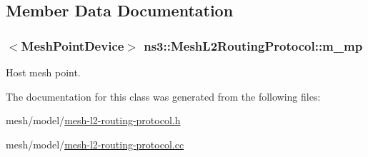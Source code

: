 \subsection{Member Data Documentation}
\subsubsection[{\texorpdfstring{m\+\_\+mp}{m_mp}}]{$<${\bf Mesh\+Point\+Device}$>$ ns3\+::\+Mesh\+L2\+Routing\+Protocol\+::m\+\_\+mp\hspace{0.3cm}{\ttfamily [protected]}}\hypertarget{classns3_1_1MeshL2RoutingProtocol_af4ebb2340b72dfc607ddf3c1ae65b54a}{}\label{classns3_1_1MeshL2RoutingProtocol_af4ebb2340b72dfc607ddf3c1ae65b54a}


Host mesh point. 



The documentation for this class was generated from the following files\+:\begin{DoxyCompactItemize}
\item 
mesh/model/\hyperlink{mesh-l2-routing-protocol_8h}{mesh-\/l2-\/routing-\/protocol.\+h}\item 
mesh/model/\hyperlink{mesh-l2-routing-protocol_8cc}{mesh-\/l2-\/routing-\/protocol.\+cc}\end{DoxyCompactItemize}
